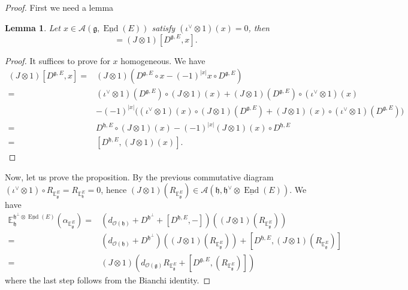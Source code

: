 \documentclass[12pt]{amsart}
\newtheorem{lem}[thm]{Lemma}
\theoremstyle{definition}
\theoremstyle{remark}
\numberwithin{equation}{section}
\newcommand{\CA}{{\mathcal A}}
\newcommand{\CO}{{\mathcal O}}
\newcommand{\1}{{\mathbb{1}}}
\newcommand{\g}{\mathfrak{g}}
\newcommand{\h}{\mathfrak{h}}
\newcommand{\End}{\operatorname{End}}
\begin{document}
\begin{proof}


First we need a lemma
\begin{lem}
Let $x \in \CA(\g, \underline{\End}(E))$ satisfy $(\iota^{\vee}\otimes 1)(x) = 0$, then
\begin{equation}
    [D^{\h, E}, (J\otimes 1)(x)] = (J\otimes 1)[D^{\g, E}, x].
\end{equation}
\end{lem}
\begin{proof}
It suffices to prove for $x$ homogeneous. We have 
\begin{align*}
    (J\otimes 1)[D^{\g, E}, x] =& (J\otimes 1)(D^{\g, E}\circ x - (-1)^{|x|}x \circ D^{\g, E})\\
    =& (\iota^{\vee} \otimes 1)(D^{\g, E}) \circ (J\otimes 1)(x) + (J\otimes 1)(D^{\g, E}) \circ (\iota^{\vee} \otimes 1)(x)\\
    &-(-1)^{|x|}\big( (\iota^{\vee} \otimes 1)(x) \circ (J\otimes 1)(D^{\g, E}) + (J\otimes 1)(x) \circ (\iota^{\vee} \otimes 1)(D^{\g, E})\big)\\
    =&D^{\h, E} \circ (J\otimes 1)(x)  -(-1)^{|x|}(J\otimes 1)(x) \circ D^{\h, E}\\
    =&[D^{\h, E}, (J\otimes 1)(x)].
\end{align*}
\end{proof}
Now, let us prove the proposition. By the previous commutative diagram $(\iota^{\vee} \otimes 1) \circ R_{\mathbb{E}_{\g}^E} = R_{\mathbb{E}_{\h}^E} = 0$, hence $(J\otimes 1)(R_{\mathbb{E}_{\g}^E}) \in \CA(\h, \h^{\vee}\otimes \underline{\End}(E))$. We have
\begin{align*}
\mathbb{E}_{\h}^{\h^{\perp}\otimes \underline{\End}(E)}(\alpha_{\mathbb{E}_{\g}^E}) =& (d_{\CO(\h)} + D^{\h^{\perp}} + [D^{\h, E}, -])((J\otimes 1)(R_{\mathbb{E}_{\g}^E})) \\
=&(d_{\CO(\h)} + D^{\h^{\perp}})((J\otimes 1)(R_{\mathbb{E}_{\g}^E})) + [D^{\h, E}, (J\otimes 1)(R_{\mathbb{E}_{\g}^E})] \\
=& (J\otimes 1)(d_{\CO(\g)} R_{\mathbb{E}_{\g}^E} + [D^{\g, E}, (R_{\mathbb{E}_{\g}^E})])
\end{align*}
where the last step follows from the Bianchi identity.


\end{proof}
\end{document}
